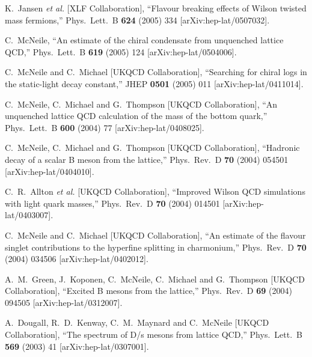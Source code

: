 \begin{thebibliography}{130}
K.~Jansen {\it et al.}  [XLF Collaboration],
``Flavour breaking effects of Wilson twisted mass fermions,''
Phys.\ Lett.\ B {\bf 624} (2005) 334
[arXiv:hep-lat/0507032].


C.~McNeile,
``An estimate of the chiral condensate from unquenched lattice QCD,''
Phys.\ Lett.\ B {\bf 619} (2005) 124
[arXiv:hep-lat/0504006].


C.~McNeile and C.~Michael  [UKQCD Collaboration],
``Searching for chiral logs in the static-light decay constant,''
JHEP {\bf 0501} (2005) 011
[arXiv:hep-lat/0411014].


C.~McNeile, C.~Michael and G.~Thompson  [UKQCD Collaboration],
``An unquenched lattice QCD calculation of the mass of the bottom
quark,''
Phys.\ Lett.\ B {\bf 600} (2004) 77
[arXiv:hep-lat/0408025].


C.~McNeile, C.~Michael and G.~Thompson  [UKQCD Collaboration],
``Hadronic decay of a scalar B meson from the lattice,''
Phys.\ Rev.\ D {\bf 70} (2004) 054501
[arXiv:hep-lat/0404010].



C.~R.~Allton {\it et al.}  [UKQCD Collaboration],
``Improved Wilson QCD simulations with light quark masses,''
Phys.\ Rev.\ D {\bf 70} (2004) 014501
[arXiv:hep-lat/0403007].

C.~McNeile and C.~Michael  [UKQCD Collaboration],
``An estimate of the flavour singlet contributions to the hyperfine
splitting
in charmonium,''
Phys.\ Rev.\ D {\bf 70} (2004) 034506
[arXiv:hep-lat/0402012].



A.~M.~Green, J.~Koponen, C.~McNeile, C.~Michael and G.~Thompson
[UKQCD
                  Collaboration],
``Excited B mesons from the lattice,''
Phys.\ Rev.\ D {\bf 69} (2004) 094505
[arXiv:hep-lat/0312007].


A.~Dougall, R.~D.~Kenway, C.~M.~Maynard and C.~McNeile  [UKQCD
                  Collaboration],
``The spectrum of D/s mesons from lattice QCD,''
Phys.\ Lett.\ B {\bf 569} (2003) 41
[arXiv:hep-lat/0307001].



\end{thebibliography}
